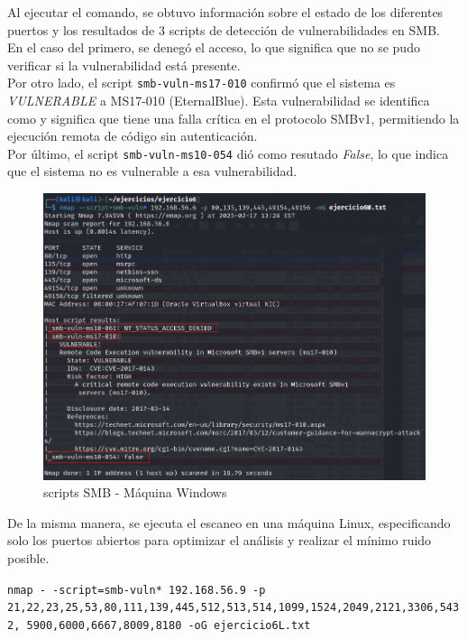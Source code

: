 \documentclass[a4paper,12pt]{article} %
\begin{document}
Al ejecutar el comando, se obtuvo información sobre el estado de los diferentes puertos y los resultados de 3 scripts de detección de vulnerabilidades en SMB. \\
En el caso del primero, se denegó el acceso, lo que significa que no se pudo verificar si la vulnerabilidad está presente. \\ 
Por otro lado, el script \texttt{smb-vuln-ms17-010} confirmó que el sistema es \textit{VULNERABLE} a MS17-010 (EternalBlue). Esta vulnerabilidad se identifica como  y  significa que tiene una falla crítica en el protocolo SMBv1, permitiendo la ejecución remota de código sin autenticación. \\
Por último, el script \texttt{smb-vuln-ms10-054} dió como resutado \textit{False}, lo que indica que el sistema no es vulnerable a esa vulnerabilidad.
\newpage
    \begin{figure} [hp!]
         \centering
         \includegraphics[width=1\textwidth]{Imagenes/eje6.png}
         \caption{scripts SMB - Máquina Windows}
         \label{fig:eje6}
    \end{figure}

De la misma manera, se ejecuta el escaneo en una máquina Linux, especificando solo los puertos abiertos para optimizar el análisis y realizar el mínimo ruido posible.

    \begin{center}
    \texttt{nmap - -script=smb-vuln* 192.168.56.9 -p
21,22,23,25,53,80,111,139,445,512,513,514,1099,1524,2049,2121,3306,5432,
5900,6000,6667,8009,8180 -oG ejercicio6L.txt}
    \end{center}
\end{document}
